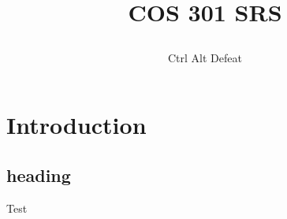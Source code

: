 \documentclass[12pt]{article}
\title{

\\
{COS 301 SRS}
}
\author{Ctrl Alt Defeat}
\begin{document}
\section{Introduction}
\subsection{heading}
Test
\end{document}
